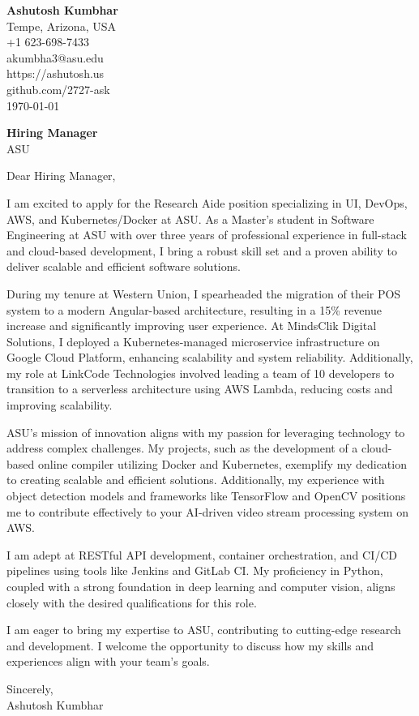 \documentclass[11pt]{article}
\begin{document}
\begin{flushleft}
\textbf{Ashutosh Kumbhar} \\
Tempe, Arizona, USA \\
+1 623-698-7433 \\
akumbha3@asu.edu \\
https://ashutosh.us \\
github.com/2727-ask \\
\today
\end{flushleft}

\vspace{0.5em}

\textbf{Hiring Manager} \\
ASU \\

\vspace{1em}

Dear Hiring Manager,

I am excited to apply for the Research Aide position specializing in UI, DevOps, AWS, and Kubernetes/Docker at ASU. As a Master's student in Software Engineering at ASU with over three years of professional experience in full-stack and cloud-based development, I bring a robust skill set and a proven ability to deliver scalable and efficient software solutions.

During my tenure at Western Union, I spearheaded the migration of their POS system to a modern Angular-based architecture, resulting in a 15\% revenue increase and significantly improving user experience. At MindsClik Digital Solutions, I deployed a Kubernetes-managed microservice infrastructure on Google Cloud Platform, enhancing scalability and system reliability. Additionally, my role at LinkCode Technologies involved leading a team of 10 developers to transition to a serverless architecture using AWS Lambda, reducing costs and improving scalability.

ASU’s mission of innovation aligns with my passion for leveraging technology to address complex challenges. My projects, such as the development of a cloud-based online compiler utilizing Docker and Kubernetes, exemplify my dedication to creating scalable and efficient solutions. Additionally, my experience with object detection models and frameworks like TensorFlow and OpenCV positions me to contribute effectively to your AI-driven video stream processing system on AWS.

I am adept at RESTful API development, container orchestration, and CI/CD pipelines using tools like Jenkins and GitLab CI. My proficiency in Python, coupled with a strong foundation in deep learning and computer vision, aligns closely with the desired qualifications for this role.

I am eager to bring my expertise to ASU, contributing to cutting-edge research and development. I welcome the opportunity to discuss how my skills and experiences align with your team’s goals.

Sincerely, \\
Ashutosh Kumbhar
\end{document}
